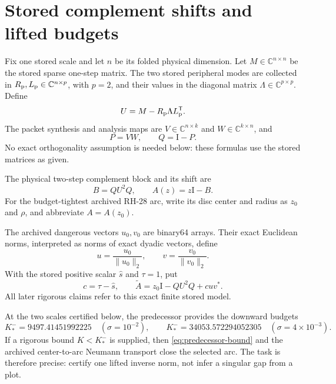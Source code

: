 \documentclass[11pt]{article}
\theoremstyle{definition}
\theoremstyle{remark}
\newcommand{\C}{\mathbb C}
\newcommand{\Id}{\mathrm I}
\newcommand{\Atilde}{\widetilde A}
\begin{document}
\section{Stored complement shifts and lifted budgets}
\label{sec:model}

Fix one stored scale and let $n$ be its folded physical dimension.  Let
$M\in\C^{n\times n}$ be the stored sparse one-step matrix.  The two stored
peripheral modes are collected in
$R_{\rm p},L_{\rm p}\in\C^{n\times p}$, with $p=2$, and their values in the
diagonal matrix $\Lambda\in\C^{p\times p}$.  Define
\begin{equation}
 U=M-R_{\rm p}\Lambda L_{\rm p}^{\mathsf T}.
 \label{eq:stored-one-step}
\end{equation}
The packet synthesis and analysis maps are
$V\in\C^{n\times k}$ and $W\in\C^{k\times n}$, and
\begin{equation}
 P=VW,
 \qquad
 Q=\Id-P.
 \label{eq:packet-complement}
\end{equation}
No exact orthogonality assumption is needed below: these formulas use the
stored matrices as given.

The physical two-step complement block and its shift are
\begin{equation}
 B=QU^2Q,
 \qquad
 A(z)=z\Id-B.
 \label{eq:physical-shift}
\end{equation}
For the budget-tightest archived RH-28 arc, write its disc center and radius
as $z_0$ and $\rho$, and abbreviate $A=A(z_0)$.

The archived dangerous vectors $u_0,v_0$ are binary64 arrays.  Their exact
Euclidean norms, interpreted as norms of exact dyadic vectors, define
\begin{equation}
 u=\frac{u_0}{\|u_0\|_2},
 \qquad
 v=\frac{v_0}{\|v_0\|_2}.
 \label{eq:exact-normalization}
\end{equation}
With the stored positive scalar $\widehat s$ and $\tau=1$, put
\begin{equation}
 c=\tau-\widehat s,
 \qquad
 \Atilde=z_0\Id-QU^2Q+cuv^*.
 \label{eq:lifted-target}
\end{equation}
All later rigorous claims refer to this exact finite stored model.

At the two scales certified below, the predecessor provides the downward
budgets
\begin{equation}
 K_*^-=9497.41451992225
 \quad(\sigma=10^{-2}),
 \qquad
 K_*^-=34053.572294052305
 \quad(\sigma=4\times10^{-3}).
 \label{eq:two-budgets}
\end{equation}
If a rigorous bound $K<K_*^-$ is supplied, then
\cref{eq:predecessor-bound} and the archived center-to-arc Neumann transport
close the selected arc.  The task is therefore precise: certify one lifted
inverse norm, not infer a singular gap from a plot.
\end{document}
